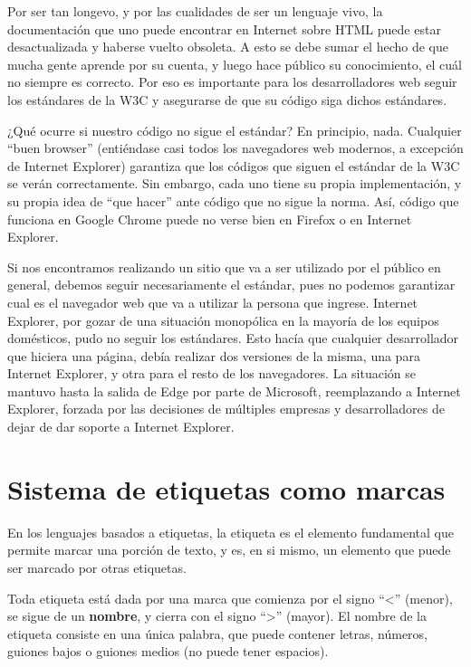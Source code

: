 Por ser tan longevo, y por las cualidades de ser un lenguaje vivo, la documentación
que uno puede encontrar en Internet sobre HTML puede estar desactualizada y haberse
vuelto obsoleta. A esto se debe sumar el hecho de que mucha gente aprende por su
cuenta, y luego hace público su conocimiento, el cuál no siempre es correcto. Por
eso es importante para los desarrolladores web seguir los estándares de la W3C y
asegurarse de que su código siga dichos estándares.

¿Qué ocurre si nuestro código no sigue el estándar? En principio, nada.
Cualquier ``buen browser'' (entiéndase casi todos los navegadores web modernos,
a excepción de Internet Explorer) garantiza que los códigos que siguen el
estándar de la W3C se verán correctamente. Sin embargo, cada uno tiene su
propia implementación, y su propia idea de ``que hacer'' ante código que no
sigue la norma. Así, código que funciona en Google Chrome puede no verse bien
en Firefox o en Internet Explorer.

Si nos encontramos realizando un sitio que va a ser utilizado por el público en
general, debemos seguir necesariamente el estándar, pues no podemos garantizar
cual es el navegador web que va a utilizar la persona que ingrese. Internet
Explorer, por gozar de una situación monopólica en la mayoría de los equipos
domésticos, pudo no seguir los estándares. Esto hacía que cualquier desarrollador
que hiciera una página, debía realizar dos versiones de la misma, una para
Internet Explorer, y otra para el resto de los navegadores. La situación se
mantuvo hasta la salida de Edge por parte de Microsoft, reemplazando a Internet
Explorer, forzada por las decisiones de múltiples empresas y desarrolladores de
dejar de dar soporte a Internet Explorer.

\section{Sistema de etiquetas como marcas}

En los lenguajes basados a etiquetas, la etiqueta es el elemento fundamental
que permite marcar una porción de texto, y es, en si mismo, un elemento que
puede ser marcado por otras etiquetas.

Toda etiqueta está dada por una marca que comienza por el signo ``<'' (menor),
se sigue de un \textbf{nombre}, y cierra con el signo ``>'' (mayor). El nombre
de la etiqueta consiste en una única palabra, que puede contener letras, números,
guiones bajos o guiones medios (no puede tener espacios).

